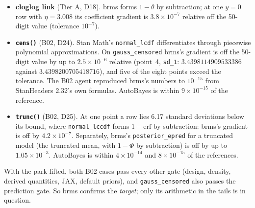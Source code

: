 \documentclass[11pt]{article}
\newcommand{\code}[1]{\texttt{#1}}
\begin{document}
\begin{itemize}
\item \textbf{cloglog link} (Tier A, D18). brms forms $1-\theta$ by subtraction; at one $y = 0$ row with $\eta = 3.008$
  its coefficient gradient is $3.8\times10^{-7}$ relative off the 50-digit value (tolerance $10^{-7}$).
\item \textbf{\code{cens()}} (B02, D24). Stan Math's \code{normal\_lcdf} differentiates through piecewise polynomial
  approximations. On \code{gauss\_censored} brms's gradient is off the 50-digit value by up to $2.5\times10^{-6}$
  relative (point~4, \code{sd\_1}: $3.4398114909533386$ against $3.4398200705418716$), and five of the eight points
  exceed the tolerance. The B02 agent reproduced brms's numbers to $10^{-15}$ from StanHeaders 2.32's own formulas.
  AutoBayes is within $9\times10^{-15}$ of the reference.
\item \textbf{\code{trunc()}} (B02, D25). At one point a row lies 6.17 standard deviations below its bound, where
  \code{normal\_lccdf} forms $1-\mathrm{erf}$ by subtraction: brms's gradient is off by $4.2\times10^{-7}$. Separately,
  brms's \code{posterior\_epred} for a truncated model (the truncated mean, with $1-\Phi$ by subtraction) is off by up
  to $1.05\times10^{-3}$. AutoBayes is within $4\times10^{-14}$ and $8\times10^{-15}$ of the references.
\end{itemize}

\noindent With the park lifted, both B02 cases pass every other gate (design, density, derived quantities, JAX,
default priors), and \code{gauss\_censored} also passes the prediction gate. So brms confirms the \emph{target}; only
its arithmetic in the tails is in question.
\end{document}
